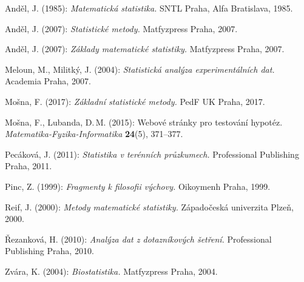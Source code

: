 \renewcommand{\refname}{Literatura}
\begin{thebibliography}{10}
\setlength\itemsep{2pt}
\frenchspacing
{} Anděl, J. (1985): {\it Matematická statistika.} SNTL Praha, Alfa Bratislava, 1985.

 Anděl, J. (2007): {\it Statistické metody.} Matfyzpress Praha, 2007.

 Anděl, J. (2007): {\it Základy matematické statistiky.} Matfyzpress Praha, 2007.

 Meloun, M., Militký, J. (2004): {\it Statistická analýza experimentálních dat.} Academia Praha, 2007.

 Mošna, F. (2017): {\it Základní statistické metody.} PedF UK Praha, 2017.

 Mošna, F., Lubanda, D.\,M. (2015): Webové stránky pro testování hypotéz. {\it Matematika-Fyzika-Informatika} {\bf 24}(5), 371--377.

 Pecáková, J. (2011): {\it Statistika v terénních průzkumech.} Professional Publishing Praha, 2011.

 Pinc, Z. (1999): {\it Fragmenty k filosofii výchovy.} Oikoymenh Praha, 1999.

 Reif, J. (2000): {\it Metody matematické statistiky.} Západočeská univerzita Plzeň, 2000.

 Řezanková, H. (2010): {\it Analýza dat z dotazníkových šetření.} Professional Publishing Praha, 2010.

 Zvára, K. (2004): {\it Biostatistika.} Matfyzpress Praha, 2004.

\end{thebibliography}



